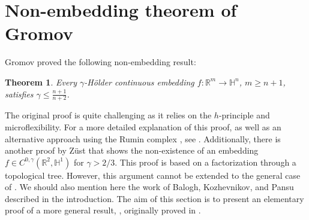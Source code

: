 \documentclass[intlimits,12pt,reqno]{amsart}
\newcommand{\bbbh}{\mathbb H}
\newcommand{\R}{\mathbb R}
\numberwithin{equation}{section}
\newtheorem{theorem}{Theorem}[section]
\theoremstyle{definition}
\begin{document}
\section{Non-embedding theorem of Gromov}
\label{S4}
Gromov \cite[3.1.A]{gromov2} proved the following non-embedding result:

\begin{theorem}
\label{T55}
Every $\gamma$-H\"older continuous embedding $f:\R^m\to\bbbh^n$, $m\geq n+1$, satisfies $\gamma\leq\frac{n+1}{n+2}$.
\end{theorem}
The original proof is quite challenging as it relies on the $h$-principle and microflexibility. For a more detailed explanation of this proof, as well as an alternative approach using the Rumin complex \cite{rumin}, see \cite{pansu}. Additionally, there is another proof by Z{\"u}st \cite{zust2015} that shows the non-existence of an embedding $f \in C^{0,\gamma}(\R^2,\bbbh^1)$ for $\gamma > 2/3$. This proof is based on a factorization through a topological tree. However, this argument cannot be extended to the general case of .
We should also mention here the work of Balogh, Kozhevnikov, and Pansu \cite{BKP} described in the introduction.
The aim of this section is to present an elementary proof of a more general result, , originally proved in \cite{HS23}. 
\end{document}
